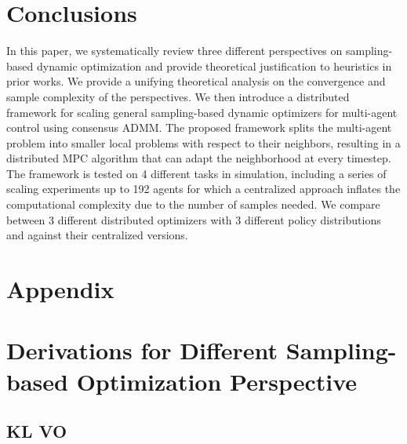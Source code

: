 \documentclass[twoside,11pt]{article}
\begin{document}
\section{Conclusions}
\label{sec: conclusions}
In this paper, we systematically review three different perspectives on sampling-based dynamic optimization and provide theoretical justification to heuristics in prior works. We provide a unifying theoretical analysis on the convergence and sample complexity of the perspectives. We then introduce a distributed framework for scaling general sampling-based dynamic optimizers for multi-agent control using consensus ADMM. The proposed framework splits the multi-agent problem into smaller local problems with respect to their neighbors, resulting in a distributed MPC algorithm that can adapt the neighborhood at every timestep. The framework is tested on 4 different tasks in simulation, including a series of scaling experiments up to 192 agents for which a centralized approach inflates the computational complexity due to the number of samples needed. We compare between 3 different distributed optimizers with 3 different policy distributions and against their centralized versions.




\newpage

\appendix
\section*{Appendix}
\label{app:theorem}



\section{Derivations for Different Sampling-based Optimization Perspective}
\subsection{KL VO}
\label{appendix: KL_VO}
\end{document}
